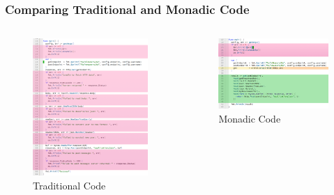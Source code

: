 \documentclass{beamer}
\begin{document}
\begin{frame}[fragile,t]
  \frametitle{Comparing Traditional and Monadic Code}
  \begin{columns}
    \begin{column}{.45\paperwidth}
      \begin{figure}
        \includegraphics[keepaspectratio,height=\paperheight,width=.4\paperwidth]{images/small/current_errors_highlighted}
        \caption{Traditional Code}
      \end{figure}
    \end{column}
    \begin{column}{.45\paperwidth}
      \begin{figure}
        \includegraphics[keepaspectratio,height=\paperheight,width=.4\paperwidth]{images/small/monadic_highlighted}
        \caption{Monadic Code}
      \end{figure}
    \end{column}
  \end{columns}
\end{frame}
\end{document}
